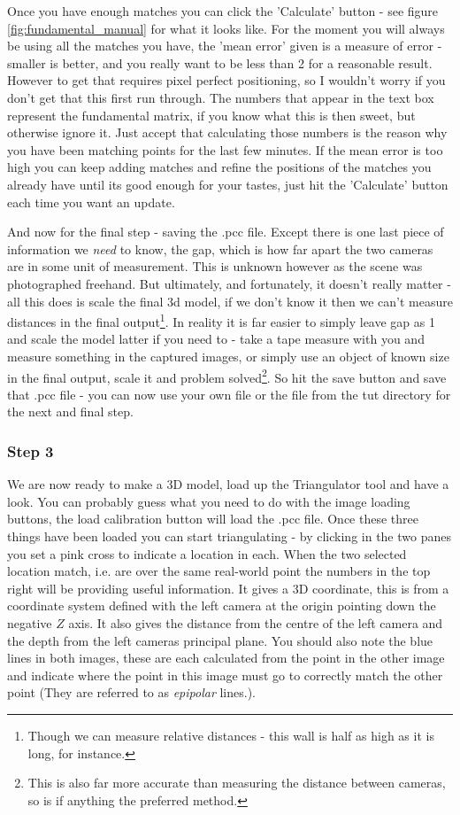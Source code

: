 \documentclass[10pt,a4paper,twoside]{article}
\begin{document}
Once you have enough matches you can click the 'Calculate' button - see figure \ref{fig:fundamental_manual} for what it looks like. For the moment you will always be using all the matches you have, the 'mean error' given is a measure of error - smaller is better, and you really want to be less than 2 for a reasonable result. However to get that requires pixel perfect positioning, so I wouldn't worry if you don't get that this first run through. The numbers that appear in the text box represent the fundamental matrix, if you know what this is then sweet, but otherwise ignore it. Just accept that calculating those numbers is the reason why you have been matching points for the last few minutes. If the mean error is too high you can keep adding matches and refine the positions of the matches you already have until its good enough for your tastes, just hit the 'Calculate' button each time you want an update.

And now for the final step - saving the .pcc file. Except there is one last piece of information we \emph{need} to know, the gap, which is how far apart the two cameras are in some unit of measurement. This is unknown however as the scene was photographed freehand. But ultimately, and fortunately, it doesn't really matter - all this does is scale the final 3d model, if we don't know it then we can't measure distances in the final output\footnote{Though we can measure relative distances - this wall is half as high as it is long, for instance.}. In reality it is far easier to simply leave gap as 1 and scale the model latter if you need to - take a tape measure with you and measure something in the captured images, or simply use an object of known size in the final output, scale it and problem solved\footnote{This is also far more accurate than measuring the distance between cameras, so is if anything the preferred method.}. So hit the save button and save that .pcc file - you can now use your own file or the file from the tut directory for the next and final step.


\subsubsection {Step 3}
We are now ready to make a 3D model, load up the Triangulator tool and have a look. You can probably guess what you need to do with the image loading buttons, the load calibration button will load the .pcc file. Once these three things have been loaded you can start triangulating - by clicking in the two panes you set a pink cross to indicate a location in each. When the two selected location match, i.e. are over the same real-world point the numbers in the top right will be providing useful information. It gives a 3D coordinate, this is from a coordinate system defined with the left camera at the origin pointing down the negative $Z$ axis. It also gives the distance from the centre of the left camera and the depth from the left cameras principal plane. You should also note the blue lines in both images, these are each calculated from the point in the other image and indicate where the point in this image must go to correctly match the other point (They are referred to as \emph{epipolar} lines.).
\end{document}

